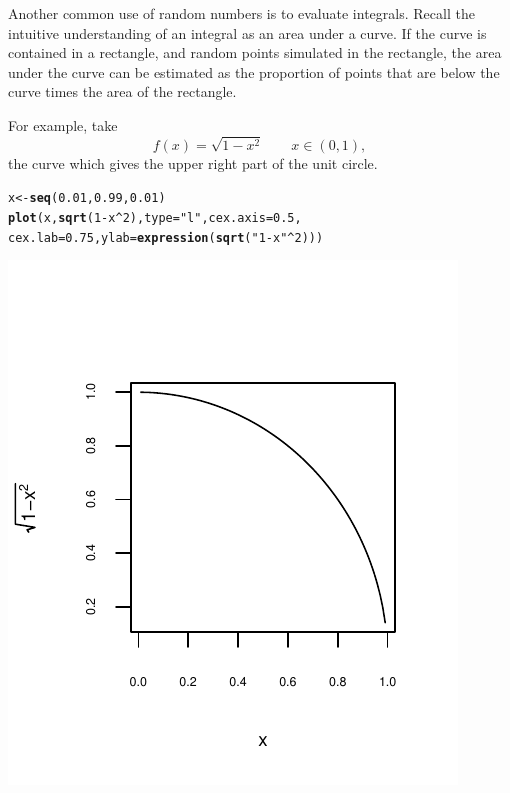 \documentclass{article}\usepackage[]{graphicx}\usepackage[]{color}
\makeatletter
\def\maxwidth{ %
  \ifdim\Gin@nat@width>\linewidth
    \linewidth
  \else
    \Gin@nat@width
  \fi
}
\newcommand{\hlnum}[1]{\textcolor[rgb]{0.686,0.059,0.569}{#1}}%
\newcommand{\hlstr}[1]{\textcolor[rgb]{0.192,0.494,0.8}{#1}}%
\newcommand{\hlopt}[1]{\textcolor[rgb]{0,0,0}{#1}}%
\newcommand{\hlstd}[1]{\textcolor[rgb]{0.345,0.345,0.345}{#1}}%
\newcommand{\hlkwb}[1]{\textcolor[rgb]{0.69,0.353,0.396}{#1}}%
\newcommand{\hlkwc}[1]{\textcolor[rgb]{0.333,0.667,0.333}{#1}}%
\newcommand{\hlkwd}[1]{\textcolor[rgb]{0.737,0.353,0.396}{\textbf{#1}}}%
\newenvironment{kframe}{%
 \def\at@end@of@kframe{}%
 \ifinner\ifhmode%
  \def\at@end@of@kframe{\end{minipage}}%
  \begin{minipage}{\columnwidth}%
 \fi\fi%
 \def\FrameCommand##1{\hskip\@totalleftmargin \hskip-\fboxsep
 \colorbox{shadecolor}{##1}\hskip-\fboxsep
     \hskip-\linewidth \hskip-\@totalleftmargin \hskip\columnwidth}%
 \MakeFramed {\advance\hsize-\width
   \@totalleftmargin\z@ \linewidth\hsize
   \@setminipage}}%
 {\par\unskip\endMakeFramed%
 \at@end@of@kframe}
\newenvironment{knitrout}{}{} %
\makeatother
\begin{document}
Another common use of random numbers is to evaluate integrals. Recall the intuitive understanding of an integral as an area under a curve. If the curve is contained in a rectangle, and random points simulated in the rectangle, the area under the curve can be estimated as the proportion of points that are below the curve times the area of the rectangle.

For example, take
\begin{equation}
f(x) = \sqrt{1-x^2} \qquad x \in (0,1),
\end{equation}
the curve which gives the upper right part of the unit circle.
\begin{knitrout}
\color{fgcolor}\begin{kframe}
\begin{alltt}
\hlstd{x} \hlkwb{<-} \hlkwd{seq}\hlstd{(}\hlnum{0.01}\hlstd{,} \hlnum{0.99}\hlstd{,} \hlnum{0.01}\hlstd{)}
\hlkwd{plot}\hlstd{(x,} \hlkwd{sqrt}\hlstd{(}\hlnum{1} \hlopt{-} \hlstd{x}\hlopt{^}\hlnum{2}\hlstd{),} \hlkwc{type} \hlstd{=} \hlstr{"l"}\hlstd{,} \hlkwc{cex.axis} \hlstd{=} \hlnum{0.5}\hlstd{,}
     \hlkwc{cex.lab} \hlstd{=} \hlnum{0.75}\hlstd{,} \hlkwc{ylab} \hlstd{=} \hlkwd{expression}\hlstd{(}\hlkwd{sqrt}\hlstd{(}\hlstr{"1-x"}\hlopt{^}\hlnum{2}\hlstd{)))}
\end{alltt}
\end{kframe}

{\centering \includegraphics[width=\maxwidth]{figure/unnamed-chunk-26-1} 

}



\end{knitrout}
\end{document}
